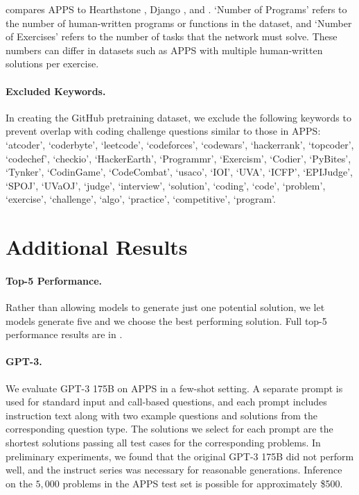 \documentclass{article}
\begin{document}
 compares APPS to Hearthstone \citep{Ling2016LatentPN}, Django \citep{oda2015ase:pseudogen1}, and \citet{Zavershynskyi2018NAPSNP}. `Number of Programs' refers to the number of human-written programs or functions in the dataset, and `Number of Exercises' refers to the number of tasks that the network must solve. These numbers can differ in datasets such as APPS with multiple human-written solutions per exercise.





\paragraph{Excluded Keywords.}\label{appx:excluded_keywords} In creating the GitHub pretraining dataset, we exclude the following keywords to prevent overlap with coding challenge questions similar to those in APPS: `atcoder', `coderbyte', `leetcode', `codeforces', `codewars', `hackerrank', `topcoder', `codechef', `checkio', `HackerEarth', `Programmr', `Exercism', `Codier', `PyBites', `Tynker', `CodinGame', `CodeCombat', `usaco', `IOI', `UVA', `ICFP', `EPIJudge', `SPOJ', `UVaOJ', `judge', `interview', `solution', `coding', `code', `problem', `exercise', `challenge', `algo', `practice', `competitive', `program'.

\section{Additional Results}

\paragraph{Top-5 Performance.} Rather than allowing models to generate just one potential solution, we let models generate five and we choose the best performing solution. Full top-5 performance results are in .

\paragraph{GPT-3.}
We evaluate GPT-3 175B on APPS in a few-shot setting. A separate prompt is used for standard input and call-based questions, and each prompt includes instruction text along with two example questions and solutions from the corresponding question type. The solutions we select for each prompt are the shortest solutions passing all test cases for the corresponding problems. In preliminary experiments, we found that the original GPT-3 175B did not perform well, and the instruct series was necessary for reasonable generations. Inference on the $5,\!000$ problems in the APPS test set is possible for approximately \$500.
\end{document}
